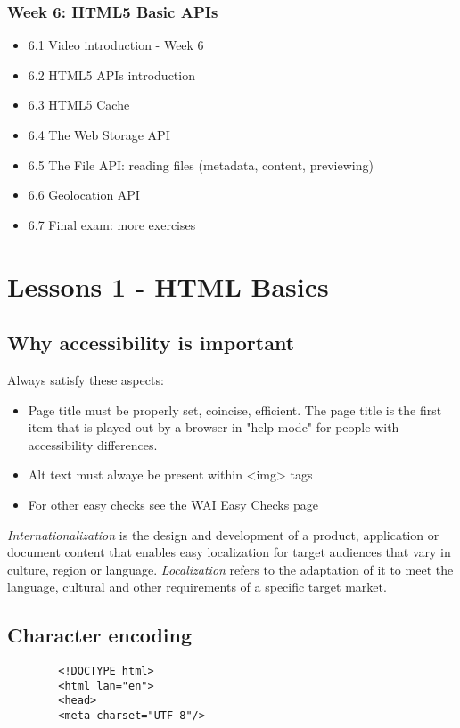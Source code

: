 \documentclass[a4paper,11pt]{book}
\begin{document}
    \subsection{Week 6: HTML5 Basic APIs}
    \begin{itemize}
        \item 6.1 Video introduction - Week 6
        \item 6.2 HTML5 APIs introduction
        \item 6.3 HTML5 Cache
        \item 6.4 The Web Storage API
        \item 6.5 The File API: reading files (metadata, content, previewing)
        \item 6.6 Geolocation API
        \item 6.7 Final exam: more exercises
    \end{itemize}


\chapter{Lessons 1 - HTML Basics}
    \section{Why accessibility is important}
    Always satisfy these aspects:
    \begin{itemize}
        \item Page title must be properly set, coincise, efficient.
            The page title is the first item that is played out by a browser
            in "help mode" for people with accessibility differences.
        \item Alt text must alwaye be present within <img> tags
        \item For other easy checks see the WAI Easy Checks page
    \end{itemize}
    \emph{Internationalization} is the design and development of a product, application
    or document content that enables easy localization for target audiences that
    vary in culture, region or language.
    \emph{Localization} refers to the adaptation of it to meet the language, cultural
    and other requirements of a specific target market.
    \section{Character encoding}
    \begin{verbatim}
        <!DOCTYPE html>
        <html lan="en">
        <head>
        <meta charset="UTF-8"/>
    \end{verbatim}
\end{document}
